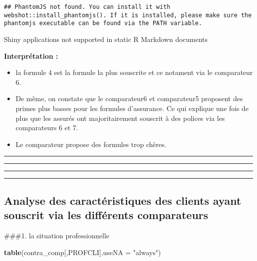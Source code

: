 \documentclass[
]{article}
\newenvironment{Shaded}{\begin{snugshade}}{\end{snugshade}}
\newcommand{\DataTypeTok}[1]{\textcolor[rgb]{0.13,0.29,0.53}{#1}}
\newcommand{\KeywordTok}[1]{\textcolor[rgb]{0.13,0.29,0.53}{\textbf{#1}}}
\newcommand{\NormalTok}[1]{#1}
\newcommand{\StringTok}[1]{\textcolor[rgb]{0.31,0.60,0.02}{#1}}
\begin{document}
\begin{verbatim}
## PhantomJS not found. You can install it with webshot::install_phantomjs(). If it is installed, please make sure the phantomjs executable can be found via the PATH variable.
\end{verbatim}

Shiny applications not supported in static R Markdown documents

\textbf{Interprétation :}

\begin{itemize}
\item
  la formule 4 est la formule la plus souscrite et ce notament via le
  comparateur 6.
\item
  De même, on constate que le comparateur6 et comparateur5 proposent des
  primes plus basses pour les formules d'assurance. Ce qui explique une
  fois de plus que les assurés ont majoritairement souscrit à des
  polices via les comparateurs 6 et 7.
\item
  Le comparateur propose des formules trop chères.
\end{itemize}

\begin{center}\rule{0.5\linewidth}{0.5pt}\end{center}

\begin{center}\rule{0.5\linewidth}{0.5pt}\end{center}

\begin{center}\rule{0.5\linewidth}{0.5pt}\end{center}

\begin{center}\rule{0.5\linewidth}{0.5pt}\end{center}

\hypertarget{analyse-des-caractuxe9ristiques-des-clients-ayant-souscrit-via-les-diffuxe9rents-comparateurs}{%
\subsection{Analyse des caractéristiques des clients ayant souscrit via
les différents
comparateurs}\label{analyse-des-caractuxe9ristiques-des-clients-ayant-souscrit-via-les-diffuxe9rents-comparateurs}}

\#\#\#1. la situation professionnelle

\begin{Shaded}
\begin{Highlighting}[]
\KeywordTok{table}\NormalTok{(contra_comp[,PROFCLI],}\DataTypeTok{useNA =} \StringTok{"always"}\NormalTok{)}
\end{Highlighting}
\end{Shaded}
\end{document}
